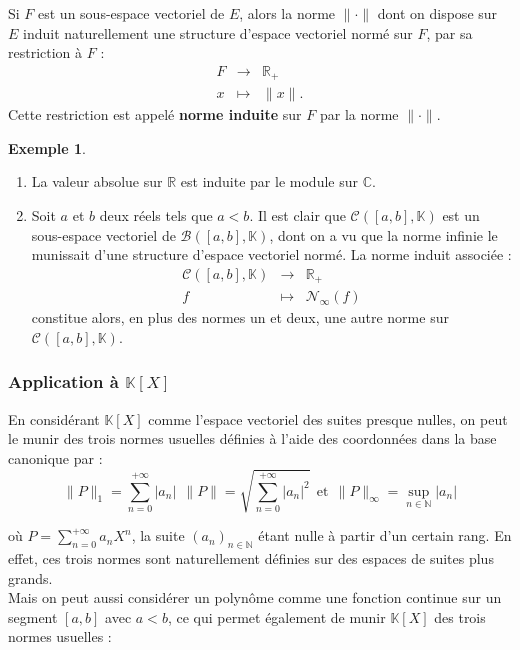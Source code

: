 \documentclass[french]{article}
\newcommand{\N}{\mathbb{N}}
\newcommand{\R}{\mathbb{R}}
\newcommand{\C}{\mathbb{C}}
\newcommand{\K}{\mathbb{K}}
\theoremstyle{plain}
\theoremstyle{definition}
\newtheorem*{ex}{Exemple}
\theoremstyle{remark}
\begin{document}
Si $F$ est un sous-espace vectoriel de $E$, alors la norme $\lVert \cdot\rVert$ dont on dispose sur $E$ induit naturellement une structure d'espace vectoriel normé sur $F$, par sa restriction à $F$ : $$\begin{array}{rcl}
	F&\longrightarrow&\R_+\\
	x&\longmapsto&\lVert x\rVert.
\end{array}$$ Cette restriction est appelé \textbf{norme induite} sur $F$ par la norme $\lVert\cdot\rVert$.

\begin{ex}
	\begin{enumerate}
		\item La valeur absolue sur $\R$ est induite par le module sur $\C$.
		\item Soit $a$ et $b$ deux réels tels que $a<b$. Il est clair que $\mathcal{C}([a,b],\K)$ est un sous-espace vectoriel de $\mathcal{B}([a,b],\K)$, dont on a vu que la norme infinie le munissait d'une structure d'espace vectoriel normé. La norme induit associée : $$\begin{array}{rcl}
			\mathcal{C}([a,b],\K)&\longrightarrow&\R_+\\
			f&\longmapsto&\mathcal{N}_\infty(f)
		\end{array}$$ constitue alors, en plus des normes un et deux, une autre norme sur $\mathcal{C}([a,b],\K)$.
	\end{enumerate}
\end{ex}

\subsubsection*{Application à $\K[X]$}

En considérant $\K[X]$ comme l'espace vectoriel des suites presque nulles, on peut le munir des trois normes usuelles définies à l'aide des coordonnées dans la base canonique par :
$$\lVert P\rVert_1=\sum_{n=0}^{+\infty}\lvert a_n\rvert\ \ \lVert P\rVert=\sqrt{\sum_{n=0}^{+\infty}\lvert a_n\rvert^2}\ \ \text{et}\ \ \lVert P\rVert_\infty=\underset{n\in\N}{\sup}\lvert a_n\rvert$$

où $P=\displaystyle\sum_{n=0}^{+\infty}a_nX^n$, la suite $(a_n)_{n\in\N}$ étant nulle à partir d'un certain rang. En effet, ces trois normes sont naturellement définies sur des espaces de suites plus grands.\\
Mais on peut aussi considérer un polynôme comme une fonction continue sur un segment $[a,b]$ avec $a<b$, ce qui permet également de munir $\K[X]$ des trois normes usuelles : 
\end{document}
